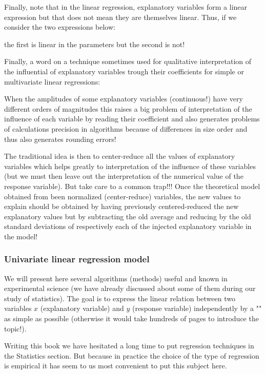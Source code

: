 	Finally, note that in the linear regression, explanatory variables form a linear expression but that does not mean they are themselves linear. Thus, if we consider the two expressions below:
	
	the first is linear in the parameters but the second is not!
	
	Finally, a word on a technique sometimes used for qualitative interpretation of the influential of explanatory variables trough their coefficients for simple or multivariate linear regressions:
	
	When the amplitudes of some explanatory variables (continuous!) have very different orders of magnitudes this raises a big problem of interpretation of the influence of each variable by reading their coefficient and also generates problems of calculations precision in algorithms because of differences in size order and thus also generates rounding errors!
	
	The traditional idea is then to center-reduce all the values of explanatory variables which helps greatly to interpretation of the influence of these variables (but we must then leave out the interpretation of the numerical value of the response variable). But take care to a common trap!!! Once the theoretical model obtained from been normalized (center-reduce) variables, the new values to explain should be obtained by having previously centered-reduced the new explanatory values but by subtracting the old average and reducing by the old standard deviations of respectively each of the injected explanatory variable in the model!
	
	\pagebreak
	\subsubsection{Univariate linear regression model}\label{simple linear regression}
	
	We will present here several algorithms (methods) useful and known in experimental science (we have already discussed about some of them during our study of statistics). The goal is to express the linear relation between two variables $x$ (explanatory variable) and $y$ (response variable) independently by a "" as simple as possible (otherwise it would take hundreds of pages to introduce the topic!).
	
	\begin{tcolorbox}[title=Remark,colframe=black,arc=10pt]
	Writing this book we have hesitated a long time to put regression techniques in the Statistics section. But because in practice the choice of the type of regression is empirical it has seem to us most convenient to put this subject here.
	\end{tcolorbox}	
	
